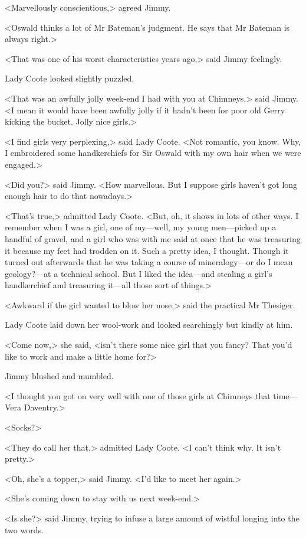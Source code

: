 <Marvellously conscientious,> agreed Jimmy.

<Oswald thinks a lot of Mr Bateman's judgment. He says that Mr Bateman is always right.>

<That was one of his worst characteristics years ago,> said Jimmy feelingly.

Lady Coote looked slightly puzzled.

<That was an awfully jolly week-end I had with you at Chimneys,> said Jimmy. <I mean it would have been awfully jolly if it hadn't been for poor old Gerry kicking the bucket. Jolly nice girls.>

<I find girls very perplexing,> said Lady Coote. <Not romantic, you know. Why, I embroidered some handkerchiefs for Sir Oswald with my own hair when we were engaged.>

<Did you?> said Jimmy. <How marvellous. But I suppose girls haven't got long enough hair to do that nowadays.>

<That's true,> admitted Lady Coote. <But, oh, it shows in lots of other ways. I remember when I was a girl, one of my—well, my young men—picked up a handful of gravel, and a girl who was with me said at once that he was treasuring it because my feet had trodden on it. Such a pretty idea, I thought. Though it turned out afterwards that he was taking a course of mineralogy—or do I mean geology?—at a technical school. But I liked the idea—and stealing a girl's handkerchief and treasuring it—all those sort of things.>

<Awkward if the girl wanted to blow her nose,> said the practical Mr Thesiger.

Lady Coote laid down her wool-work and looked searchingly but kindly at him.

<Come now,> she said, <isn't there some nice girl that you fancy? That you'd like to work and make a little home for?>

Jimmy blushed and mumbled.

<I thought you got on very well with one of those girls at Chimneys that time—Vera Daventry.>

<Socks?>

<They do call her that,> admitted Lady Coote. <I can't think why. It isn't pretty.>

<Oh, she's a topper,> said Jimmy. <I'd like to meet her again.>

<She's coming down to stay with us next week-end.>

<Is she?> said Jimmy, trying to infuse a large amount of wistful longing into the two words.


